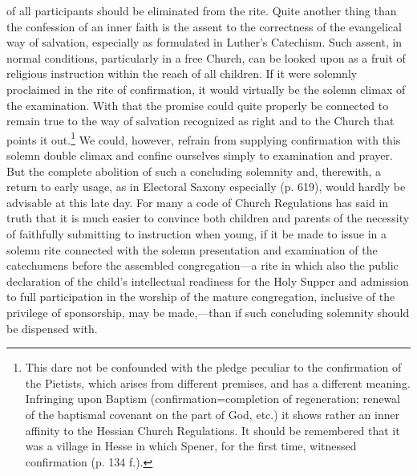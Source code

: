 of all participants should be eliminated from the rite. Quite another thing than the confession of an inner faith is the assent to the correctness of the evangelical way of salvation, especially as formulated in Luther’s Catechism. Such assent, in normal conditions, particularly in a free Church, can be looked upon as a fruit of religious instruction within the reach of all children. If it were solemnly proclaimed in the rite of confirmation, it would virtually be the solemn climax of the examination. With that the promise could quite properly be connected to remain true to the way of salvation recognized as right and to the Church that points it out.\footnote{This dare not be confounded with the pledge peculiar to the confirmation of the Pietists, which arises from different premises, and has a different meaning. Infringing upon Baptism (confirmation=completion of regeneration; renewal of the baptismal covenant on the part of God, etc.) it shows rather an inner affinity to the Hessian Church Regulations. It should be remembered that it was a village in Hesse in which Spener, for the first time, witnessed confirmation (p. 134 f.).} We could, however, refrain from supplying confirmation with this solemn double climax and confine ourselves simply to examination and prayer. But the complete abolition of such a concluding solemnity and, therewith, a return to early usage, as in Electoral Saxony especially (p. 619), would hardly be advisable at this late day. For many a code of Church Regulations has said in truth that it is much easier to convince both children and parents of the necessity of faithfully submitting to instruction when young, if it be made to issue in a solemn rite connected with the solemn presentation and examination of the catechumens before the assembled congregation—a rite in which also the public declaration of the child’s intellectual readiness for the Holy Supper and admission to full participation in the worship of the mature congregation, inclusive of the privilege of sponsorship, may be made,—than if such concluding solemnity should be dispensed with.

